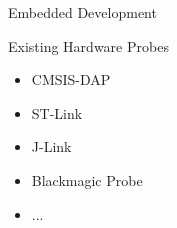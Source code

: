 \documentclass[aspectratio=1610,14pt,t]{beamer}
\begin{document}
\begin{frame}[c]{Embedded Development}
\end{frame}

\begin{frame}[c]{Existing Hardware Probes}
  \begin{itemize}
    \item CMSIS-DAP
    \item ST-Link
    \item J-Link
    \item Blackmagic Probe
    \item ...
  \end{itemize}
\end{frame}
\end{document}
